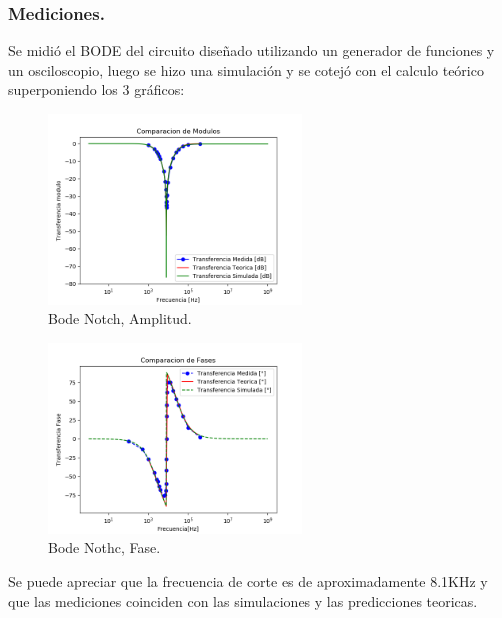 \documentclass[a4paper]{article}
\begin{document}
\subsubsection{Mediciones.}
Se midió el BODE del circuito diseñado utilizando un generador de funciones y un osciloscopio, luego se hizo una simulación y se cotejó con el calculo teórico superponiendo los 3 gráficos:
\begin{figure}[H]
	\centering
	\includegraphics[width=0.6\textwidth, trim={0 0.1cm  0 0},clip]{BodeNotchAmp.png}
\caption{Bode Notch, Amplitud.}
	\label{fig:BodeNotchAmp}
\end{figure}
\begin{figure}[H]
	\centering
	\includegraphics[width=0.6\textwidth, trim={0 0.1cm  0 0},clip]{BodeNotchPhase.png}
\caption{Bode Nothc, Fase.}
	\label{fig:BodeNotchPhase}
\end{figure}
Se puede apreciar que la frecuencia de corte es de aproximadamente 8.1KHz y que las mediciones coinciden con las simulaciones y las predicciones teoricas.
\end{document}
